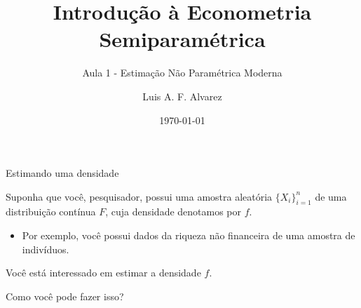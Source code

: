 \documentclass[11pt]{beamer}
\author{Luis A. F. Alvarez}
\title{Introdução à Econometria Semiparamétrica}
\subtitle{Aula 1 - Estimação Não Paramétrica Moderna}
\date{\today}
\newenvironment{halfwideitemize}{\itemize\addtolength{\itemsep}{0.5em}}{\enditemize}
\begin{document}
	\begin{frame}[plain]
	\maketitle
	\end{frame}
	\begin{frame}{Estimando uma densidade}
		\begin{halfwideitemize}
			\item Suponha que você, pesquisador, possui uma amostra aleatória $\{X_i\}_{i=1}^n$ de uma distribuição contínua $F$, cuja densidade denotamos por $f$.
			\begin{itemize}
				\item Por exemplo, você possui dados da riqueza não financeira de uma amostra de indivíduos.
			\end{itemize}
			\item Você está interessado em estimar a densidade $f$.
			\item Como você pode fazer isso?
		\end{halfwideitemize}
	\end{frame}
	
\end{document}
